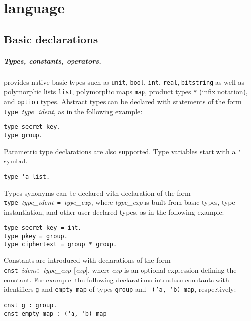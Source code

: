 
\chapter{\EasyCrypt language}


\section{Basic declarations}
\paragraph*{Types, constants, operators.}

\EasyCrypt provides native basic types such as \verb|unit|,
\verb|bool|, \verb|int|, \verb|real|, \verb|bitstring| as well as
polymorphic lists \verb|list|, polymorphic maps \verb|map|, product
types \verb!*! (infix notation), and \verb|option| types.
%
Abstract types can be declared with statements of the form 
\verb+type+~\textit{type_ident}, as in the following example:
\begin{verbatim} 
type secret_key.
type group.
\end{verbatim} 
Parametric type declarations are also supported. Type variables start
with a \verb|'| symbol:
\begin{verbatim}
type 'a list.
\end{verbatim}
%
Types synonyms can be declared with declaration of the form 
\verb+type+~\textit{type_ident}~\verb+=+~\textit{type_exp},
where \textit{type_exp} is built from basic types, type instantiation,
and other user-declared types, as in the following example:
\begin{verbatim} 
type secret_key = int.
type pkey = group.
type ciphertext = group * group. 
\end{verbatim} 

Constants are introduced with declarations of the form
\verb+cnst+~\textit{ident}\verb+:+~\textit{type_exp}~[\textit{exp}],
where \textit{exp} is an optional expression defining the constant.
For example, the following declarations introduce constants with
identifiers {\tt g} and {\tt empty_map} of types {\tt group} and {\tt
  ('a, 'b) map}, respectively:
\begin{verbatim}
cnst g : group.
cnst empty_map : ('a, 'b) map.
\end{verbatim}

